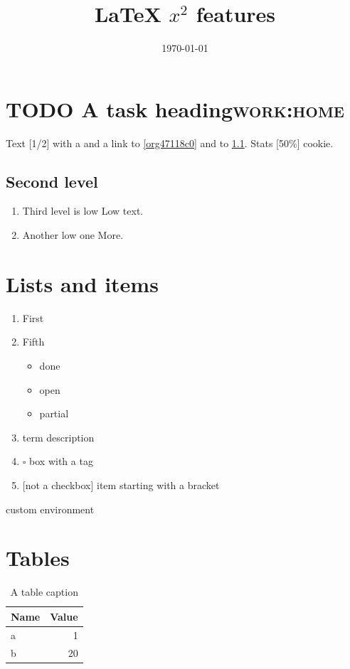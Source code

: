 \documentclass[11pt]{article}
\date{\today}
\title{\LaTeX{} \(x^2\) features}
\begin{document}
\maketitle
\tableofcontents

\section{{\bfseries\sffamily TODO}  A task heading\hfill{}\textsc{work:home}}
\label{sec:org0af2b60}
Text [1/2] with a \label{org47118c0} and a link to \ref{org47118c0} and to \ref{sec:org1f85fd9}.
Stats [50\%] cookie.
\subsection{Second level}
\label{sec:org1f85fd9}
\begin{enumerate}
\item Third level is low
\label{sec:org0e4d337}
Low text.
\item Another low one
\label{sec:org3028fdc}
More.
\end{enumerate}
\section{Lists and items}
\label{sec:org799290e}
\begin{enumerate}
\item First
\setcounter{enumi}{4}
\item Fifth
\begin{itemize}
\item[{$\boxtimes$}] done
\item[{$\square$}] open
\item[{$\boxminus$}] partial
\end{itemize}
\item{term} description
\item{$\square$ box} with a tag
\item {[}not a checkbox] item starting with a bracket
\end{enumerate}

\begin{compactitem}[label=--]
\item custom environment
\end{compactitem}
\section{Tables}
\label{sec:orgc302278}
\begin{table}[H]
\caption[Short]{\label{tab:orgb3336ea}A table caption}
\centering
\begin{tabular}{|l|r|}
Name & Value\\
\hline
a & 1\\
b & 20\\
\end{tabular}
\end{table}
\end{document}
